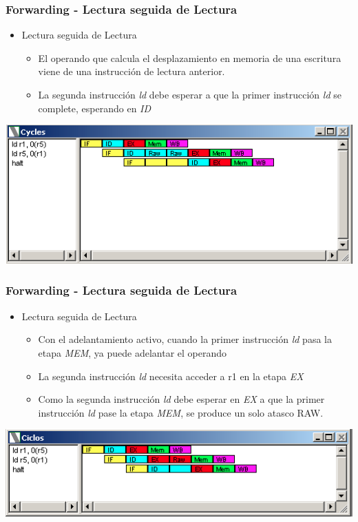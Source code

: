 \documentclass{beamer}
\begin{document}
\begin{frame}[fragile]
\frametitle{Forwarding - Lectura seguida de Lectura}
\begin{itemize}
\item Lectura seguida de Lectura
\begin{itemize}
\item El operando que calcula el desplazamiento en memoria de una escritura viene de una instrucción de lectura anterior.
\item La segunda instrucción \emph{ld} debe esperar a que la primer instrucción \emph{ld} se complete, esperando en \emph{ID}
\end{itemize}
\end{itemize}
\includegraphics[scale=0.45]{forwarding-7.png}
\end{frame}

\begin{frame}[fragile]
\frametitle{Forwarding - Lectura seguida de Lectura}
\begin{itemize}
\item Lectura seguida de Lectura
\begin{itemize}
\item Con el adelantamiento activo, cuando la primer instrucción \emph{ld} pasa la etapa \emph{MEM}, ya puede adelantar el operando
\item La segunda instrucción \emph{ld} necesita acceder a r1 en la etapa \emph{EX}
\item Como la segunda instrucción \emph{ld} debe esperar en \emph{EX} a que la primer instrucción  \emph{ld} pase la etapa \emph{MEM}, se produce un solo atasco RAW.

\end{itemize}
\end{itemize}
\includegraphics[scale=0.45]{forwarding-7-lectura-lectura.png}
\end{frame}
\end{document}
